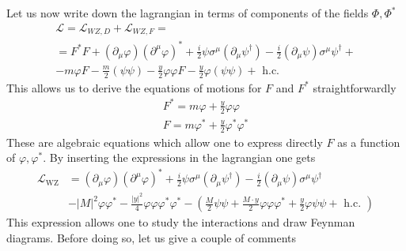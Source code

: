\documentclass[12pt]{article}
\begin{document}
Let us now write down the lagrangian in terms of components of the fields $\Phi, \Phi^*$
\begin{gather*}
  \mathcal{L} = \mathcal{L}_{WZ, D} + \mathcal{L}_{WZ, F} = \\ 
  = F^{*} F+\left(\partial_{\mu} \varphi\right)\left(\partial^{\mu} \varphi\right)^{*}+\frac{i}{2} \psi \sigma^{\mu}\left(\partial_{\mu} \psi^{\dagger}\right)-\frac{i}{2}\left(\partial_{\mu} \psi\right) \sigma^{\mu} \psi^{\dagger} + \\
      -m \varphi F-\frac{m}{2}(\psi \psi)-\frac{y}{2} \varphi \varphi F-\frac{y}{2} \varphi(\psi \psi)+\text { h.c. }
\end{gather*}
This allows us to derive the equations of motions for $F$ and $F^*$ straightforwardly 
\begin{gather*}
  F^{*} = m \varphi+\frac{y}{2} \varphi \varphi \\
  F = m\varphi^* + \frac{y}{2}\varphi^*\varphi^* 
\end{gather*}
These are algebraic equations which allow one to express directly $F$ as a function of $\varphi, \varphi^*$. By inserting the expressions in the lagrangian one gets 
\begin{equation}
  \begin{aligned}
      \mathcal{L}_{\mathrm{WZ}} &=\left(\partial_{\mu} \varphi\right)\left(\partial^{\mu} \varphi\right)^{*}+\frac{i}{2} \psi \sigma^{\mu}\left(\partial_{\mu} \psi^{\dagger}\right)-\frac{i}{2}\left(\partial_{\mu} \psi\right) \sigma^{\mu} \psi^{\dagger} \\
      &-|M|^{2} \varphi \varphi^{*}-\frac{|y|^{2}}{4} \varphi \varphi \varphi^{*} \varphi^{*}-\left(\frac{M}{2} \psi \psi+\frac{M \cdot y}{2} \varphi \varphi \varphi^{*}+\frac{y}{2} \varphi \psi \psi+\text { h.c. }\right)
      \end{aligned}
      \label{eq:lagrangian_components}
\end{equation}
This expression allows one to study the interactions and draw Feynman diagrams. Before doing so, let us give a couple of comments 
\end{document}
